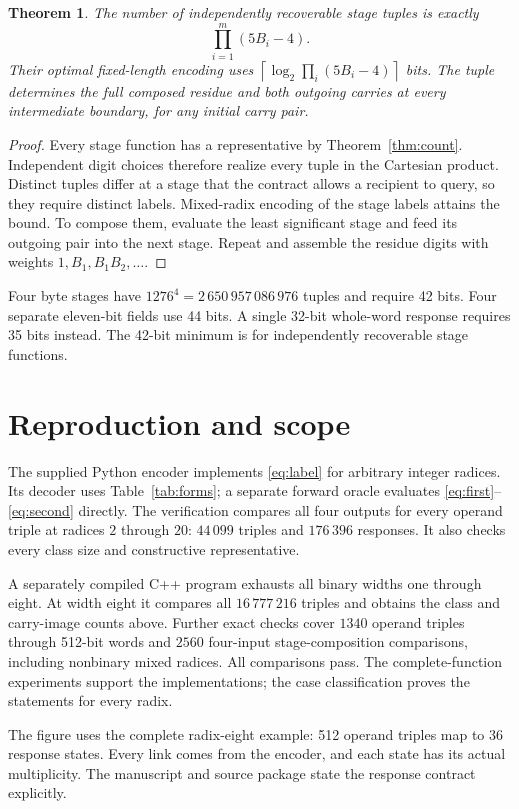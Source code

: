 \documentclass[11pt,a4paper]{article}
\newtheorem{theorem}{Theorem}
\theoremstyle{definition}\newtheorem{definition}[theorem]{Definition}
\begin{document}
\begin{theorem}\label{thm:stages}
The number of independently recoverable stage tuples is exactly
\[
 \prod_{i=1}^{m}(5B_i-4).
\]
Their optimal fixed-length encoding uses
$\left\lceil\log_2\prod_i(5B_i-4)\right\rceil$ bits.
The tuple determines the full composed residue and both outgoing
carries at every intermediate boundary, for any initial carry pair.
\end{theorem}
\begin{proof}
Every stage function has a representative by
Theorem~\ref{thm:count}. Independent digit choices therefore realize
every tuple in the Cartesian product. Distinct tuples differ at a
stage that the contract allows a recipient to query, so they require
distinct labels. Mixed-radix encoding of the stage labels attains the
bound. To compose them, evaluate the least significant stage and feed
its outgoing pair into the next stage. Repeat and assemble the residue
digits with weights $1,B_1,B_1B_2,\ldots$.
\end{proof}

Four byte stages have $1276^4=2\,650\,957\,086\,976$ tuples and
require 42 bits. Four separate eleven-bit fields use 44 bits.
A single 32-bit whole-word response requires 35 bits instead.
The 42-bit minimum is for independently recoverable stage functions.

\section{Reproduction and scope}
The supplied Python encoder implements \eqref{eq:label} for arbitrary
integer radices. Its decoder uses Table~\ref{tab:forms}; a separate
forward oracle evaluates \eqref{eq:first}--\eqref{eq:second} directly.
The verification compares all four outputs for every operand triple
at radices $2$ through $20$: $44\,099$ triples and $176\,396$ responses.
It also checks every class size and constructive representative.

A separately compiled C++ program exhausts all binary widths one
through eight. At width eight it compares all $16\,777\,216$ triples
and obtains the class and carry-image counts above. Further exact
checks cover $1340$ operand triples through 512-bit words and $2560$
four-input stage-composition comparisons, including nonbinary mixed
radices. All comparisons pass. The complete-function experiments
support the implementations; the case classification proves the
statements for every radix.

The figure uses the complete radix-eight example: 512 operand triples
map to 36 response states. Every link comes from the encoder, and each
state has its actual multiplicity. The manuscript and source package
state the response contract explicitly.
\end{document}
